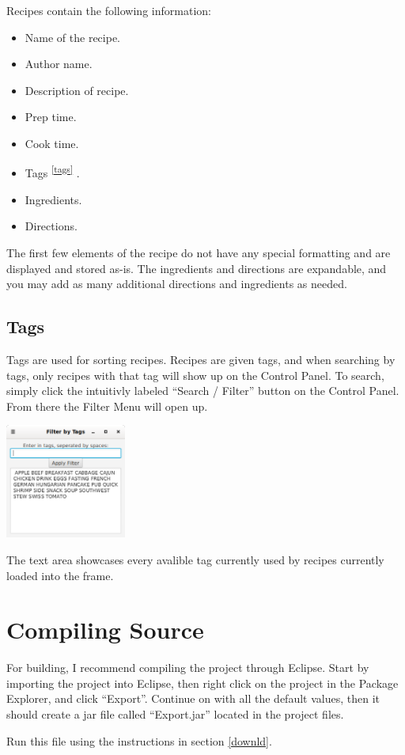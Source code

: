 \documentclass{article}
\begin{document}
Recipes contain the following information:

\begin{itemize}
\item{Name of the recipe.}
\item{Author name.}
\item{Description of recipe.}
\item{Prep time.}
\item{Cook time.}
\item{Tags\textsuperscript{ \ref{tags} }. }
\item{Ingredients.}
\item{Directions.}
\end{itemize}

The first few elements of the recipe do not have any special
formatting and are displayed and stored as-is. The ingredients and
directions are expandable, and you may add as many additional
directions and ingredients as needed. 

\subsection{Tags\label{tags}}

Tags are used for sorting recipes. Recipes are given tags, and when
searching by tags, only recipes with that tag will show up on the
Control Panel. To search, simply click the intuitivly labeled ``Search
/ Filter'' button on the Control Panel. From there the Filter Menu
will open up.

\begin{center}
  \includegraphics[width=150px]{img/filter.png}
\end{center}

The text area showcases every avalible tag currently used by recipes
currently loaded into the frame.

\section{Compiling Source}

For building, I recommend compiling the project through Eclipse. Start
by importing the project into Eclipse, then right click on the project
in the Package Explorer, and click ``Export''. Continue on with all
the default values, then it should create a jar file called
``Export.jar'' located in the project files.

Run this file using the instructions in section \ref{downld}.
\end{document}
